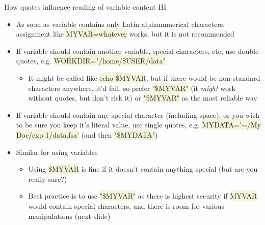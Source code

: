 \documentclass[compress, xelatex, 11pt, xcolor=svgnames, aspectratio=169,
	hyperref={
		bookmarks=true,
		unicode=true,
		colorlinks=true,
		pdftitle={Linux, command line and MetaCentrum},
		plainpages=false,
		pdfauthor={Vojtech Zeisek},
		pdfsubject={Course about use of Linux command line, writing shell scripts and using MetaCentrum of CESNET},
		pdfcreator={XeLaTeX},
		pdfkeywords={Linux, GNU, BASH, shell, command line, MetaCentrum},
		linkcolor=DarkRed, %
		anchorcolor=DarkBlue, %
		citecolor=Indigo, %
		filecolor=NavyBlue, %
		menucolor=DarkMagenta, %
		urlcolor=DarkBlue, %
		},
	url={hyphens, lowtilde} %
	]{beamer}
\renewcommand{\texttt}[1]{\colorbox{Beige}{{\ttfamily #1}}}
\begin{document}
\begin{frame}{How quotes influence reading of variable content III}
	\begin{itemize}
		\item As soon as variable contains only Latin alphanumerical characters, assignment like \texttt{MYVAR=whatever} works, but it is not recommended
		\item If variable should contain another variable, special characters, etc, use double quotes, e.g. \texttt{WORKDIR="/home/\$USER/data"}
		\begin{itemize}
		 \item It might be called like \texttt{echo \$MYVAR}, but if there would be non-standard characters anywhere, it'd fail, so prefer \texttt{"\$MYVAR"} (it \textit{might} work without quotes, but don't risk it) or \texttt{"\$\textbraceleft MYVAR\textbraceright"} as the most reliable way
		\end{itemize}
		\item If variable should contain any special character (including space), or you wish to be sure you keep it's literal value, use single quotes, e.g. \texttt{MYDATA='$\sim$/My Doc/exp 1/data.fsa'} (and then \texttt{"\$\textbraceleft MYDATA\textbraceright"})
		\item Similar for using variables
		\begin{itemize}
			\item Using \texttt{\$MYVAR} is fine if it doesn't contain anything special (but are you really sure?)
			\item Best practice is to use \texttt{"\$\textbraceleft MYVAR\textbraceright"} as there is highest security if \texttt{MYVAR} would contain special characters, and there is room for various manipulations (next slide)
		\end{itemize}
	\end{itemize}
\end{frame}
\end{document}
